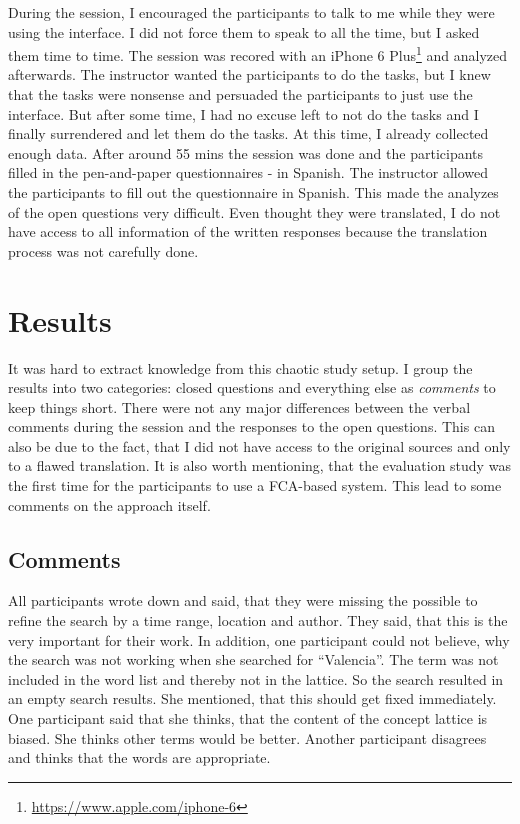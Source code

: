 \documentclass[11pt]{report}
\begin{document}
During the session, I encouraged the participants to talk to me while they were using the interface. I did not force them to speak to all the time, but I asked them time to time. The session was recored with an iPhone 6 Plus\footnote{\url{https://www.apple.com/iphone-6}} and analyzed afterwards. The instructor wanted the participants to do the tasks, but I knew that the tasks were nonsense and persuaded the participants to just use the interface. But after some time, I had no excuse left to not do the tasks and I finally surrendered and let them do the tasks. At this time, I already collected enough data. After around 55 mins the session was done and the participants filled in the pen-and-paper questionnaires - in Spanish. The instructor allowed the participants to fill out the questionnaire in Spanish. This made the analyzes of the open questions very difficult. Even thought they were translated, I do not have access to all information of the written responses because the translation process was not carefully done.
\section{Results}

It was hard to extract knowledge from this chaotic study setup. I group the results into two categories: closed questions and everything else as \textit{comments} to keep things short. There were not any major differences between the verbal comments during the session and the responses to the open questions. This can also be due to the fact, that I did not have access to the original sources and only to a flawed translation. It is also worth mentioning, that the evaluation study was the first time for the participants to use a FCA-based system. This lead to some comments on the approach itself.

\subsection{Comments}
All participants wrote down and said, that they were missing the possible to refine the search by a time range, location and author. They said, that this is the very important for their work. In addition, one participant could not believe, why the search was not working when she searched for ``Valencia''. The term was not included in the word list and thereby not in the lattice. So the search resulted in an empty search results. She mentioned, that this should get fixed immediately. One participant said that she thinks, that the content of the concept lattice is biased. She thinks other terms would be better. Another participant disagrees and thinks that the words are appropriate. \\
\end{document}
